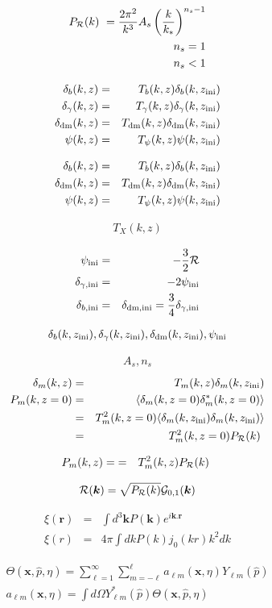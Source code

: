 \documentclass[a4paper, 11pt]{article}
\def\ba{\begin{eqnarray}}
\def\ea{\end{eqnarray}}
\begin{document}
\ba
P_{\cal R }(k)  = \frac{2\pi^{2}}{k^{3}} A_{s} \left( \frac{k}{k_{*}} \right)^{n_{s} -1 } \\
n_{s} = 1 \\
n_{s} < 1
\ea

\ba
\delta_{b}(k,z) &=& T_{b}(k,z) \delta_{b}(k,z_{\rm ini})  \\
\delta_{\gamma}(k,z) &=& T_{\gamma}(k,z) \delta_{\gamma}(k,z_{\rm ini}) \\
\delta_{\rm dm}(k,z) &=& T_{\rm dm}(k,z) \delta_{\rm dm}(k,z_{\rm ini}) \\
\psi(k,z) &=& T_{\rm \psi}(k,z)  \psi(k,z_{\rm ini}) 
\ea


\ba
\delta_{b}(k,z) &=& T_{b}(k,z) \delta_{b}(k,z_{\rm ini})  \\
\delta_{\rm dm}(k,z) &=& T_{\rm dm}(k,z) \delta_{\rm dm}(k,z_{\rm ini}) \\
\psi(k,z) &=& T_{\rm \psi}(k,z)  \psi(k,z_{\rm ini}) 
\ea



\ba
T_{X}(k,z)
\ea

\ba
\psi_{\rm ini} &=& -\frac{3}{2} {\cal R} \\
\delta_{\gamma, \rm ini } &=& -2\psi_{\rm ini} \\
\delta_{b, \rm ini } &=& \delta_{\rm dm, \rm ini} =  \frac{3}{4} \delta_{\gamma, \rm ini } 
\ea

\ba
\delta_{b}(k,z_{\rm ini}), \delta_{\gamma}(k,z_{\rm ini}), \delta_{\rm dm}(k,z_{\rm ini}), \psi_{\rm ini}
\ea

\ba
A_{s}, n_{s}
\ea
\ba
\delta_{m}(k,z) &=& T_{m}(k,z) \delta_{m}(k,z_{\rm ini})  \\
P_{m}(k,z=0) &=& \langle \delta_{m}(k,z=0) \delta^{*}_{m}(k,z=0)  \rangle \\
&=& T^{2}_{m}(k,z=0) \langle \delta_{m}(k,z_{\rm ini}) \delta_{m}(k,z_{\rm ini}) \rangle \\
&=& T^{2}_{m}(k,z=0)  P_{\cal R }(k) 
\ea

\ba
P_{m}(k,z)  = &=& T^{2}_{m}(k,z)  P_{\cal R }(k) 
\ea

\ba
{\cal R}(\bm{k}) = \sqrt{P_{\cal R }(k)} {\cal G}_{0,1}(\bm{k}) 
\ea

\ba
\xi(\bm{r}) &=&  \int d^{3}\bm{k} P(\bm{k}) e^{i \bm{k}. \bm{r}} \\
\xi(r) &=&  4\pi \int dk P(k) j_{0}(kr) k^{2} dk
\ea


\ba
\Theta(\bm{x}, \hat{p}, \eta) = \sum_{\ell=1}^{\infty} \sum^{\ell}_{m=-\ell} a_{\ell m }(\bm{x}, \eta) Y_{\ell m} (\hat{p}) \\
a_{\ell m }(\bm{x}, \eta) = \int d\Omega Y^{*}_{\ell m} (\hat{p})\Theta(\bm{x}, \hat{p}, \eta)
\ea
\end{document}
